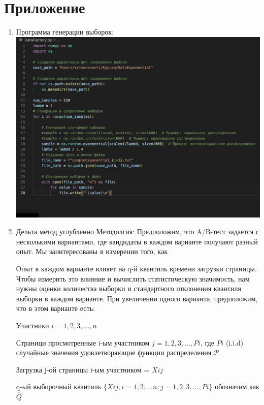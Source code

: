 \documentclass[specialist,
               substylefile = spbu_report.rtx,
               subf,href,colorlinks=true, 12pt]{disser}
\begin{document}
\section {Приложение}
\begin{enumerate} 
    \item Программа генерации выборок:
        \label{sec: Приложение 1}
        \newline
        \includegraphics[width = 6in]{image1.png}
    \item Дельта метод углубленно
        \label{sec: Приложение 2}
        Методолгия:
        Предположим, что A/B-тест задается с несколькими вариантами, где кандидаты в каждом варианте получают разный опыт. Мы заинтересованы в измерении того, как
        
        Опыт в каждом варианте влияет на q-й квантиль времени загрузки страницы. Чтобы измерить это влияние и вычислить статистическую значимость, нам нужны оценки количества выборки и стандартного отклонения квантиля выборки в каждом варианте. При увеличении одного варианта, предположим, что в этом варианте есть:
        
        Участники $i = 1,2,3,  ... , n$

        Страници просмотренные i-ым участником $j = 1, 2, 3, ... ,\textit{P}{i}$, где $\textit{P}{i}$ (i.i.d) случайные значения удовлетворяющие функции распрелеления $\mathcal{P}$.

        Загрузка j-ой страницы i-ым участником = $\textit{X}{ij}$   

        q-ый выборочный квантиль $\{\textit{X}{ij}, i = 1,2,...n; j = 1,2,3, ... ,  \textit{P}{i} \}$ обозначим как $\widehat{Q}$ 


\end{enumerate}
\end{document}
